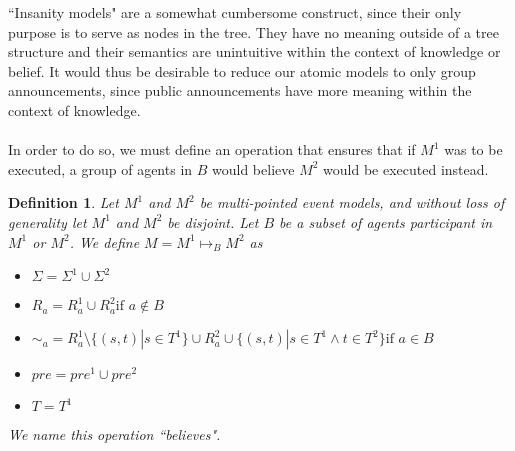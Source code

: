 \documentclass[12pt, a4paper, titlepage]{scrartcl}
\newtheorem{defn}{Definition}[subsection]
\numberwithin{equation}{section}
\begin{document}
``Insanity models" are a somewhat cumbersome construct, since their only purpose
is to serve as nodes in the tree.
They have no meaning outside of a tree structure and their semantics are
unintuitive within the context of knowledge or belief.
It would thus be desirable to reduce our atomic models to only group
announcements, since public announcements have more meaning within the context of
knowledge.\\
\\
In order to do so, we must define an operation that ensures that if $M^1$ was to
be executed, a group of agents in $B$ would believe $M^2$ would be executed
instead.
\begin{defn} \label{believes}
Let $M^1$ and $M^2$ be multi-pointed event models, and without loss of
generality let $M^1$ and $M^2$ be disjoint.
Let $B$ be a subset of agents participant in $M^1$ or $M^2$.
We define $M = M^1 \mapsto_B M^2$ as 
\begin{itemize}
  \item $\Sigma = \Sigma^1 \cup \Sigma^2$
  \item $R_a =
    R^1_a \cup R^2_a \text{if } a \notin B$
	\item $\sim_a =
      R^1_a \setminus \{(s,t) | s \in T^1 \} \cup
      R^2_a \cup
      \{(s,t) | s \in T^1 \land t \in T^2 \}
    \text{if } a \in B$
  \item $pre = pre^1 \cup pre^2$
  \item $T = T^1$
\end{itemize}
We name this operation ``believes".
\end{defn}
\end{document}
